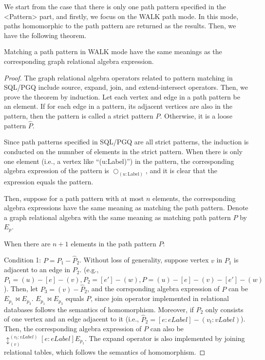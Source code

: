We start from the case that there is only one path pattern specified in the <Pattern> part, and firstly, we focus on the WALK path mode.
In this mode, paths homomorphic to the path pattern are returned as the results.
Then, we have the following theorem.

\begin{theorem}
    Matching a path pattern in WALK mode have the same meanings as the corresponding graph relational algebra expression. 
\end{theorem}
\begin{proof}
    The graph relational algebra operators related to pattern matching in SQL/PGQ include source, expand, join, and extend-intersect operators.
    Then, we prove the theorem by induction.
    Let each vertex and edge in a path pattern be an element.
    If for each edge in a pattern, its adjacent vertices are also in the pattern, then the pattern is called a strict pattern $P$.
    Otherwise, it is a loose pattern $\hat{P}$.

    Since path patterns specified in SQL/PGQ are all strict patterns, the induction is conducted on the numnber of elements in the strict pattern.
    When there is only one element (i.e., a vertex like ``(u:Label)'') in the pattern, the corresponding algebra expression of the pattern is $\bigcirc_{(u:\text{Label})}$, and it is clear that the expression equals the pattern.

    Then, suppose for a path pattern with at most $n$ elements, the corresponding algebra expressions have the same meaning as matching the path pattern.
    Denote a graph relational algebra with the same meaning as matching path pattern $P$ by $E_p$.
    
    When there are $n + 1$ elements in the path pattern $P$:
    


    Condition 1: $P = P_1 - \hat{P}_2$.
    Without loss of generality, suppose vertex $v$ in $P_1$ is adjacent to an edge in $P_2$.
    (e.g., $P_1 = (u)-[e]-(v), P_2 = [e']-(w), P = (u)-[e]-(v)-[e']-(w)$).
    Then, let $P_3 = (v)-\hat{P}_2$, and the corrsponding algebra expression of $P$ can be $E_{p_1} \Join E_{p_3}$.
    $E_{p_1} \Join E_{p_3}$ equals $P$, since join operator implemented in relational databases follows the semantics of homomorphism.
    Moreover, if $\hat{P}_2$ only consists of one vertex and an edge adjacent to it (i.e., $\hat{P}_2 = [e:eLabel]-(v_t:vLabel)$).
    Then, the corresponding algebra expression of $P$ can also be $\updownarrow_{(v)}^{(v_t:vLabel)}[e:eLabel]E_{p_1}$.
    The expand operator is also implemented by joining relational tables, which follows the semantics of homomorphism.


\end{proof}
